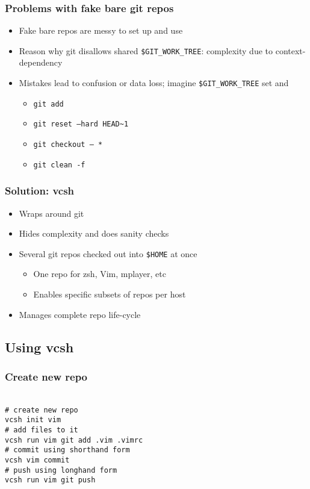 \documentclass[t]{beamer}
\begin{document}
\begin{frame}
	\frametitle{Problems with fake bare git repos}
	\begin{itemize}
		\item Fake bare repos are messy to set up and use
		\item Reason why git disallows shared \texttt{\$GIT\_WORK\_TREE}: complexity due to context-dependency
		\item Mistakes lead to confusion or data loss; imagine \texttt{\$GIT\_WORK\_TREE} set and
		\begin{itemize}
			\item \texttt{git add}
			\item \texttt{git reset --hard HEAD\~{}1}
			\item \texttt{git checkout -- *}
			\item \texttt{git clean -f}
		\end{itemize}
	\end{itemize}
\end{frame}

\begin{frame}
	\frametitle{Solution: vcsh}
	\begin{itemize}
		\item Wraps around git
		\item Hides complexity and does sanity checks
			\item Several git repos checked out into \texttt{\$HOME} at once
		\begin{itemize}
			\item One repo for zsh, Vim, mplayer, etc
			\item Enables specific subsets of repos per host
		\end{itemize}
		\item Manages complete repo life-cycle
	\end{itemize}
\end{frame}

\subsection{Using vcsh}

\begin{frame}
	\frametitle{Create new repo}
	\texttt{ \\
		\# create new repo \\
		vcsh init vim \\
		\# add files to it \\
		vcsh run vim git add .vim .vimrc \\
		\# commit using shorthand form \\
		vcsh vim commit \\
		\# push using longhand form \\
		vcsh run vim git push
	}
\end{frame}
\end{document}
